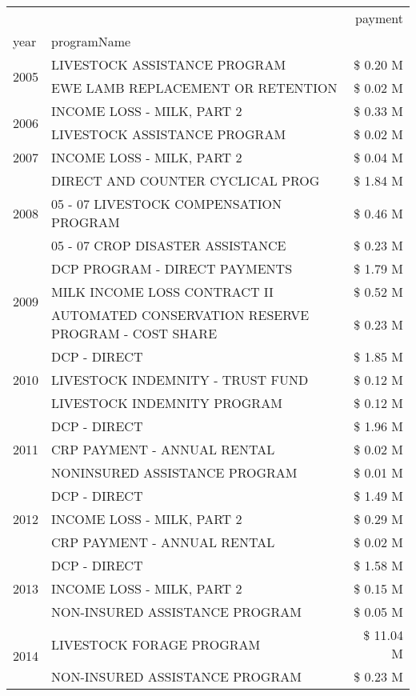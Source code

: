 \begin{tabular}{llr}
\toprule
 &  & payment \\
year & programName &  \\
\midrule
\multirow[t]{2}{*}{2005} & LIVESTOCK ASSISTANCE PROGRAM & \$ 0.20 M \\
 & EWE LAMB REPLACEMENT OR RETENTION & \$ 0.02 M \\
\cline{1-3}
\multirow[t]{2}{*}{2006} & INCOME LOSS - MILK, PART 2 & \$ 0.33 M \\
 & LIVESTOCK ASSISTANCE PROGRAM & \$ 0.02 M \\
\cline{1-3}
2007 & INCOME LOSS - MILK, PART 2 & \$ 0.04 M \\
\cline{1-3}
\multirow[t]{3}{*}{2008} & DIRECT AND COUNTER CYCLICAL PROG & \$ 1.84 M \\
 & 05 - 07 LIVESTOCK COMPENSATION PROGRAM & \$ 0.46 M \\
 & 05 - 07 CROP DISASTER ASSISTANCE & \$ 0.23 M \\
\cline{1-3}
\multirow[t]{3}{*}{2009} & DCP PROGRAM - DIRECT PAYMENTS & \$ 1.79 M \\
 & MILK INCOME LOSS CONTRACT II & \$ 0.52 M \\
 & AUTOMATED CONSERVATION RESERVE PROGRAM - COST SHARE & \$ 0.23 M \\
\cline{1-3}
\multirow[t]{3}{*}{2010} & DCP - DIRECT & \$ 1.85 M \\
 & LIVESTOCK INDEMNITY - TRUST FUND & \$ 0.12 M \\
 & LIVESTOCK INDEMNITY PROGRAM & \$ 0.12 M \\
\cline{1-3}
\multirow[t]{3}{*}{2011} & DCP - DIRECT & \$ 1.96 M \\
 & CRP PAYMENT - ANNUAL RENTAL & \$ 0.02 M \\
 & NONINSURED ASSISTANCE PROGRAM & \$ 0.01 M \\
\cline{1-3}
\multirow[t]{3}{*}{2012} & DCP - DIRECT & \$ 1.49 M \\
 & INCOME LOSS - MILK, PART 2 & \$ 0.29 M \\
 & CRP PAYMENT - ANNUAL RENTAL & \$ 0.02 M \\
\cline{1-3}
\multirow[t]{3}{*}{2013} & DCP - DIRECT & \$ 1.58 M \\
 & INCOME LOSS - MILK, PART 2 & \$ 0.15 M \\
 & NON-INSURED ASSISTANCE PROGRAM & \$ 0.05 M \\
\cline{1-3}
\multirow[t]{3}{*}{2014} & LIVESTOCK FORAGE PROGRAM & \$ 11.04 M \\
 & NON-INSURED ASSISTANCE PROGRAM & \$ 0.23 M \\

\end{tabular}
